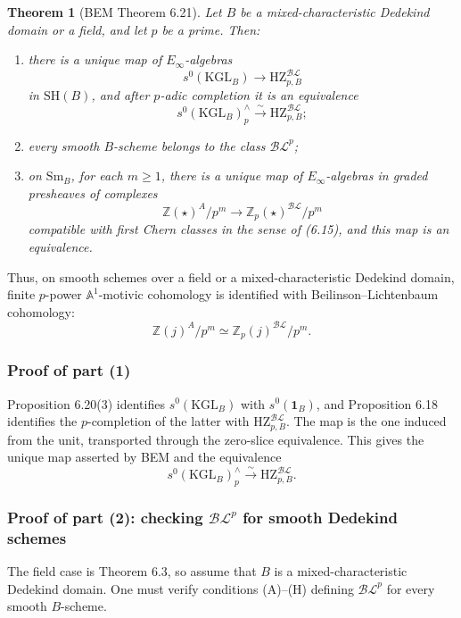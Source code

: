 \documentclass[11pt,a4paper]{article}
\newcommand{\Z}{\mathbb Z}
\newcommand{\Aone}{\mathbb A^1}
\newcommand{\SH}{\mathrm{SH}}
\newcommand{\Sm}{\mathrm{Sm}}
\newcommand{\BL}{\mathcal{BL}}
\newcommand{\BLp}{\mathcal{BL}^{p}}
\newcommand{\KGL}{\mathrm{KGL}}
\newcommand{\HZ}{\mathrm{HZ}}
\newcommand{\1}{\mathbf 1}
\theoremstyle{bemstyle}
\newtheorem{theorem}{Theorem}[section]
\theoremstyle{definition}
\begin{document}
\begin{theorem}[BEM Theorem 6.21]
Let \(B\) be a mixed-characteristic Dedekind domain or a field, and let \(p\) be a prime. Then:
\begin{enumerate}
  \item there is a unique map of \(E_\infty\)-algebras
  \[
       s^0(\KGL_B)\longrightarrow \HZ^{\BL}_{p,B}
  \]
  in \(\SH(B)\), and after \(p\)-adic completion it is an equivalence
  \[
       s^0(\KGL_B)^{\wedge}_p\xrightarrow{\sim}\HZ^{\BL}_{p,B};
  \]

  \item every smooth \(B\)-scheme belongs to the class \(\BLp\);

  \item on \(\Sm_B\), for each \(m\geq1\), there is a unique map of \(E_\infty\)-algebras in graded presheaves of complexes
  \[
       \Z(\star)^A/p^m\longrightarrow \Z_p(\star)^{\BL}/p^m
  \]
  compatible with first Chern classes in the sense of (6.15), and this map is an equivalence.
\end{enumerate}
\end{theorem}

Thus, on smooth schemes over a field or a mixed-characteristic Dedekind domain, finite \(p\)-power \(\Aone\)-motivic cohomology is identified with Beilinson--Lichtenbaum cohomology:
\[
       \Z(j)^A/p^m\simeq \Z_p(j)^{\BL}/p^m.
\]

\subsubsection{Proof of part (1)}

Proposition 6.20(3) identifies \(s^0(\KGL_B)\) with \(s^0(\1_B)\), and Proposition 6.18 identifies the \(p\)-completion of the latter with \(\HZ^{\BL}_{p,B}\). The map is the one induced from the unit, transported through the zero-slice equivalence. This gives the unique map asserted by BEM and the equivalence
\[
       s^0(\KGL_B)^{\wedge}_p\xrightarrow{\sim}\HZ^{\BL}_{p,B}.
\]

\subsubsection{Proof of part (2): checking \texorpdfstring{\(\BLp\)}{BLp} for smooth Dedekind schemes}

The field case is Theorem 6.3, so assume that \(B\) is a mixed-characteristic Dedekind domain. One must verify conditions (A)--(H) defining \(\BLp\) for every smooth \(B\)-scheme.
\end{document}
